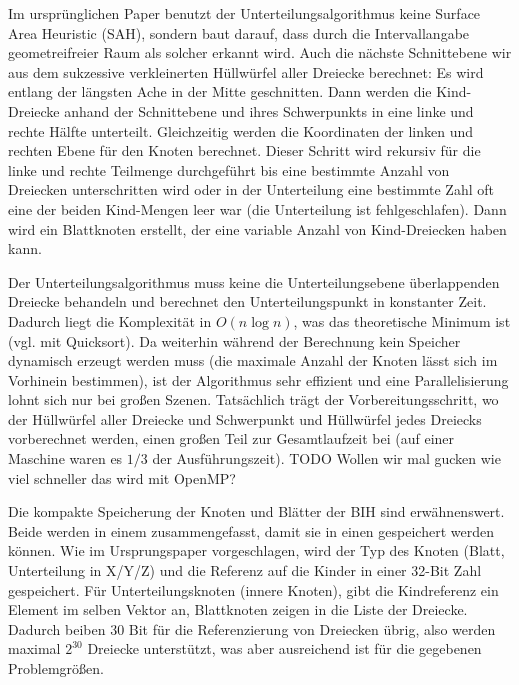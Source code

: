 Im ursprünglichen Paper benutzt der Unterteilungsalgorithmus keine Surface Area Heuristic (SAH), sondern baut darauf, dass durch die Intervallangabe geometreifreier Raum als solcher erkannt wird. Auch die nächste Schnittebene wir aus dem sukzessive verkleinerten Hüllwürfel aller Dreiecke berechnet: Es wird entlang der längsten Ache in der Mitte geschnitten. Dann werden die Kind-Dreiecke anhand der Schnittebene und ihres Schwerpunkts in eine linke und rechte Hälfte unterteilt. Gleichzeitig werden die Koordinaten der linken und rechten Ebene für den Knoten berechnet. Dieser Schritt wird rekursiv für die linke und rechte Teilmenge durchgeführt bis eine bestimmte Anzahl von Dreiecken unterschritten wird oder in der Unterteilung eine bestimmte Zahl oft eine der beiden Kind-Mengen leer war (die Unterteilung ist fehlgeschlafen). Dann wird ein Blattknoten erstellt, der eine variable Anzahl von Kind-Dreiecken haben kann.

Der Unterteilungsalgorithmus muss keine die Unterteilungsebene überlappenden Dreiecke behandeln und berechnet den Unterteilungspunkt in konstanter Zeit. Dadurch liegt die Komplexität in $O(n \log n)$, was das theoretische Minimum ist (vgl. mit Quicksort). Da weiterhin während der Berechnung kein Speicher dynamisch erzeugt werden muss (die maximale Anzahl der Knoten lässt sich im Vorhinein bestimmen), ist der Algorithmus sehr effizient und eine Parallelisierung lohnt sich nur bei großen Szenen. Tatsächlich trägt der Vorbereitungsschritt, wo der Hüllwürfel aller Dreiecke und Schwerpunkt und Hüllwürfel jedes Dreiecks vorberechnet werden, einen großen Teil zur Gesamtlaufzeit bei (auf einer Maschine waren es $1/3$ der Ausführungszeit). TODO Wollen wir mal gucken wie viel schneller das wird mit OpenMP?

Die kompakte Speicherung der Knoten und Blätter der BIH sind erwähnenswert. Beide werden in einem  zusammengefasst, damit sie in einen  gespeichert werden können. Wie im Ursprungspaper vorgeschlagen, wird der Typ des Knoten (Blatt, Unterteilung in X/Y/Z) und die Referenz auf die Kinder in einer 32-Bit Zahl gespeichert. Für Unterteilungsknoten (innere Knoten), gibt die Kindreferenz ein Element im selben Vektor an, Blattknoten zeigen in die Liste der Dreiecke. Dadurch beiben 30 Bit für die Referenzierung von Dreiecken übrig, also werden maximal $2^{30}$ Dreiecke unterstützt, was aber ausreichend ist für die gegebenen Problemgrößen.

